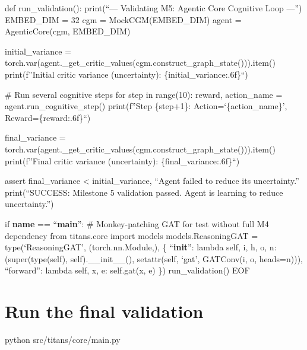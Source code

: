 \documentclass[letterpaper,twocolumn]{article}
\begin{document}
def run\_validation(): print(``--- Validating M5: Agentic Core Cognitive
Loop ---'') EMBED\_DIM = 32 cgm = MockCGM(EMBED\_DIM) agent =
AgenticCore(cgm, EMBED\_DIM)

initial\_variance =
torch.var(agent.\_get\_critic\_values(cgm.construct\_graph\_state())).item()
print(f''Initial critic variance (uncertainty):
\{initial\_variance:.6f\}``)

\# Run several cognitive steps for step in range(10): reward,
action\_name = agent.run\_cognitive\_step() print(f''Step \{step+1\}:
Action=`\{action\_name\}', Reward=\{reward:.6f\}``)

final\_variance =
torch.var(agent.\_get\_critic\_values(cgm.construct\_graph\_state())).item()
print(f''Final critic variance (uncertainty): \{final\_variance:.6f\}``)

assert final\_variance \textless{} initial\_variance, ``Agent failed to
reduce its uncertainty.'' print(``SUCCESS: Milestone 5 validation
passed. Agent is learning to reduce uncertainty.'')

if \textbf{name} == ``\textbf{main}'': \# Monkey-patching GAT for test
without full M4 dependency from titans.core import models
models.ReasoningGAT = type(`ReasoningGAT', (torch.nn.Module,), \{
``\textbf{init}'': lambda self, i, h, o, n: (super(type(self),
self).\_\_init\_\_(), setattr(self, `gat', GATConv(i, o, heads=n))),
``forward'': lambda self, x, e: self.gat(x, e) \}) run\_validation() EOF

\hypertarget{run-the-final-validation}{%
\section{Run the final validation}\label{run-the-final-validation}}

python src/titans/core/main.py
\end{document}
